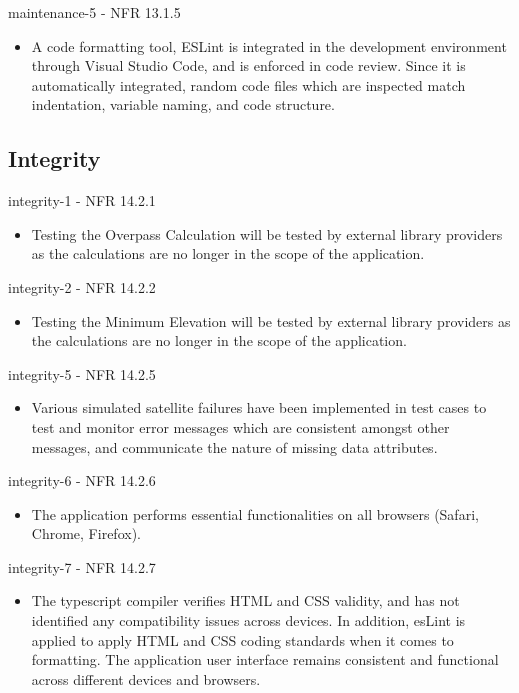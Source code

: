 \documentclass[12pt, titlepage]{article}
\begin{document}
maintenance-5 - NFR 13.1.5
\begin{itemize}
\item A code formatting tool, ESLint is integrated in the development environment through Visual Studio Code, and is enforced in code review. Since it is automatically integrated, random code files which are inspected match indentation, variable naming, and code structure.
\end{itemize}

\subsection{Integrity}

integrity-1 - NFR 14.2.1
\begin{itemize}
\item Testing the Overpass Calculation will be tested by external library providers as the calculations are no longer in the scope of the application.
\end{itemize}

integrity-2 - NFR 14.2.2
\begin{itemize}
\item Testing the Minimum Elevation will be tested by external library providers as the calculations are no longer in the scope of the application.
\end{itemize}

integrity-5 - NFR 14.2.5
\begin{itemize}
\item Various simulated satellite failures have been implemented in test cases to test and monitor error messages which are consistent amongst other messages, and communicate the nature of missing data attributes.
\end{itemize}

integrity-6 - NFR 14.2.6
\begin{itemize}
\item The application performs essential functionalities on all browsers (Safari, Chrome, Firefox).
\end{itemize}

integrity-7 - NFR 14.2.7
\begin{itemize}
\item The typescript compiler verifies HTML and CSS validity, and has not identified any compatibility issues across devices. In addition, esLint is applied to apply HTML and CSS coding standards when it comes to formatting. The application user interface remains consistent and functional across different devices and browsers.
\end{itemize}
		
\end{document}
